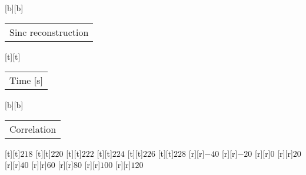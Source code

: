 %
%
[b][b]{\fontsize{8}{12}\selectfont \setlength{\tabcolsep}{0pt}\begin{tabular}{c}Sinc reconstruction\end{tabular}}%
[t][t]{\fontsize{8}{12}\selectfont \setlength{\tabcolsep}{0pt}\begin{tabular}{c}Time [s]\end{tabular}}%
[b][b]{\fontsize{8}{12}\selectfont \setlength{\tabcolsep}{0pt}\begin{tabular}{c}Correlation\end{tabular}}%
%
\fontsize{6}{8}%
\selectfont%
%
[t][t]{$218$}%
[t][t]{$220$}%
[t][t]{$222$}%
[t][t]{$224$}%
[t][t]{$226$}%
[t][t]{$228$}%
%
[r][r]{$-40$}%
[r][r]{$-20$}%
[r][r]{$0$}%
[r][r]{$20$}%
[r][r]{$40$}%
[r][r]{$60$}%
[r][r]{$80$}%
[r][r]{$100$}%
[r][r]{$120$}%
%
%
